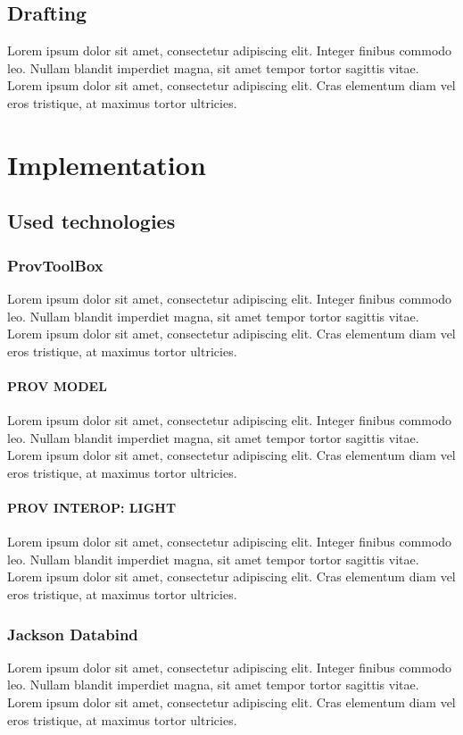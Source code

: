 \documentclass[
  digital,     %
  oneside,     %
  nosansbold,  %
  nocolorbold, %
  lof,         %
  lot,         %
]{fithesis4}
\begin{document}
\section{Drafting}
Lorem ipsum dolor sit amet, consectetur adipiscing elit. Integer finibus commodo leo. Nullam blandit imperdiet magna, sit amet tempor tortor sagittis vitae. Lorem ipsum dolor sit amet, consectetur adipiscing elit. Cras elementum diam vel eros tristique, at maximus tortor ultricies.


\chapter{Implementation}
\section{Used technologies}
\shorthandoff{-}
\subsection{ProvToolBox}
Lorem ipsum dolor sit amet, consectetur adipiscing elit. Integer finibus commodo leo. Nullam blandit imperdiet magna, sit amet tempor tortor sagittis vitae. Lorem ipsum dolor sit amet, consectetur adipiscing elit. Cras elementum diam vel eros tristique, at maximus tortor ultricies.

\subsubsection{PROV MODEL}
Lorem ipsum dolor sit amet, consectetur adipiscing elit. Integer finibus commodo leo. Nullam blandit imperdiet magna, sit amet tempor tortor sagittis vitae. Lorem ipsum dolor sit amet, consectetur adipiscing elit. Cras elementum diam vel eros tristique, at maximus tortor ultricies.

\subsubsection{PROV INTEROP: LIGHT}
Lorem ipsum dolor sit amet, consectetur adipiscing elit. Integer finibus commodo leo. Nullam blandit imperdiet magna, sit amet tempor tortor sagittis vitae. Lorem ipsum dolor sit amet, consectetur adipiscing elit. Cras elementum diam vel eros tristique, at maximus tortor ultricies.

\subsection{Jackson Databind}
Lorem ipsum dolor sit amet, consectetur adipiscing elit. Integer finibus commodo leo. Nullam blandit imperdiet magna, sit amet tempor tortor sagittis vitae. Lorem ipsum dolor sit amet, consectetur adipiscing elit. Cras elementum diam vel eros tristique, at maximus tortor ultricies.
\end{document}
